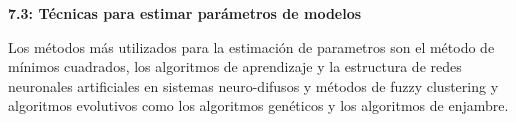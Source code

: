 \documentclass[10pt,onecolumn,twoside,letterpaper]{article}
\newcommand{\myreferences}{../../bib/library}
\begin{document}
\par{\bf 7.3: T\'ecnicas para estimar par\'ametros de modelos}\\
\par Los métodos más utilizados para la estimación de parametros son el método de mínimos cuadrados, los algoritmos de aprendizaje y la estructura de redes neuronales artificiales en sistemas neuro-difusos y métodos de fuzzy clustering y algoritmos evolutivos como los algoritmos gen\'eticos y los algoritmos de enjambre.



\end{document}
